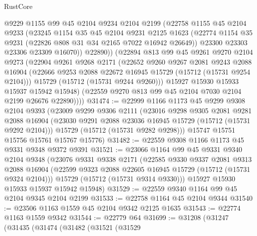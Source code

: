 \begin{lexlean}{RustCore}
\begin{coremodule}
            @9229
            @1155
            @99
            @45
            @2104
            @9234
            @2104
            @2199
            (@22758
              @1155
              @45
              @2104
              @9233
              (@23245
                @1154
                @35
                @45
                @2104
                @9231
                @2125
                @1623
                (@22774 @1154 @35 @9231 (@22826 @808 @31 @34 @2165 @7022 @16942 @26649))
                @23300
                @23303
                @23306
                @23309
                @16070))
            @22890))
        (@22894
          @813
          @99
          @45
          @9261
          @9270
          @2104
          @9273
          (@22904
            @9261
            @9268
            @2171
            (@22652
              @9260
              @9267
              @2081
              @9243
              @2088
              @16904
              (@22666 @9253 @2088 @22672 @16945 @15729 (@15712 (@15731 @9254 @2104)))
              @15729
              (@15712 (@15731 @9244 @9260)))
            @15927
            @15930
            @15933
            @15937
            @15942
            @15948)
          (@22559 @9270 @813 @99 @45 @2104 @7030 @2104 @2199 @26676 @22890))))
@31474 := @22999
    @1166
    @1173
    @45
    @9299
    @9308
    @2104
    @9393
    (@23009
      @9299
      @9306
      @2111
      (@23016
        @9298
        @9305
        @2081
        @9281
        @2088
        @16904
        (@23030 @9291 @2088 @23036 @16945 @15729 (@15712 (@15731 @9292 @2104)))
        @15729
        (@15712 (@15731 @9282 @9298)))
      @15747
      @15751
      @15756
      @15761
      @15767
      @15776)
@31482 := @22559 @9308 @1166 @1173 @45 @9331 @9348 @9372 @9391
@31521 := @23066
    @1164
    @99
    @45
    @9331
    @9340
    @2104
    @9348
    (@23076
      @9331
      @9338
      @2171
      (@22585
        @9330
        @9337
        @2081
        @9313
        @2088
        @16904
        (@22599 @9323 @2088 @22605 @16945 @15729 (@15712 (@15731 @9324 @2104)))
        @15729
        (@15712 (@15731 @9314 @9330)))
      @15927
      @15930
      @15933
      @15937
      @15942
      @15948)
@31529 := @22559 @9340 @1164 @99 @45 @2104 @9345 @2104 @2199
@31533 := @22758 @1164 @45 @2104 @9344
@31540 := @23506 @1163 @1559 @45 @2104 @9342 @2125 @1635
@31543 := @22774 @1163 @1559 @9342
@31544 := @22779 @64
@31699 := @31208
    (@31247
      (@31435
        (@31474
          (@31482
            (@31521
              (@31529

\end{coremodule}
\end{lexlean}

